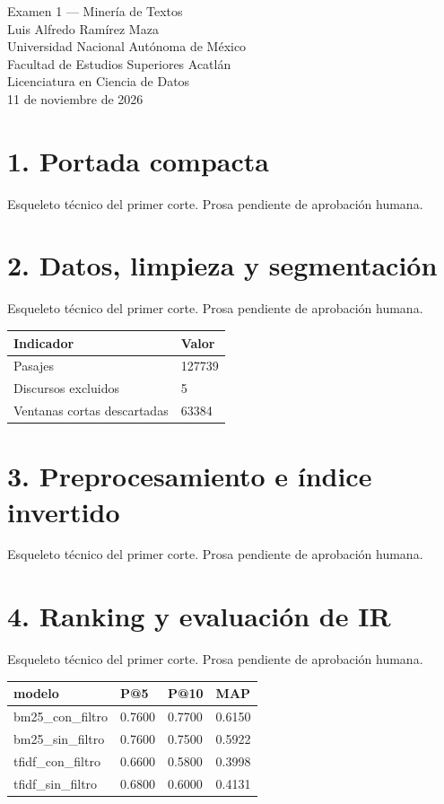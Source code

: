 \documentclass[11pt,a4paper]{article}
\begin{document}
\begin{center}\Large Examen 1 — Minería de Textos\\[8pt]
Luis Alfredo Ramírez Maza\\ Universidad Nacional Autónoma de México\\
Facultad de Estudios Superiores Acatlán\\
Licenciatura en Ciencia de Datos\\ 11 de noviembre de 2026\end{center}
\section*{1. Portada compacta}
Esqueleto técnico del primer corte. Prosa pendiente de aprobación humana.
\section*{2. Datos, limpieza y segmentación}
Esqueleto técnico del primer corte. Prosa pendiente de aprobación humana.
\par\medskip\noindent\begin{tabular}{ll}
\toprule
Indicador & Valor \\ \midrule
Pasajes & 127739 \\
Discursos excluidos & 5 \\
Ventanas cortas descartadas & 63384 \\
\bottomrule\end{tabular}\par\medskip

\newpage
\section*{3. Preprocesamiento e índice invertido}
Esqueleto técnico del primer corte. Prosa pendiente de aprobación humana.
\section*{4. Ranking y evaluación de IR}
Esqueleto técnico del primer corte. Prosa pendiente de aprobación humana.
\par\medskip\noindent\begin{tabular}{llll}
\toprule
modelo & P@5 & P@10 & MAP \\ \midrule
bm25\_con\_filtro & 0.7600 & 0.7700 & 0.6150 \\
bm25\_sin\_filtro & 0.7600 & 0.7500 & 0.5922 \\
tfidf\_con\_filtro & 0.6600 & 0.5800 & 0.3998 \\
tfidf\_sin\_filtro & 0.6800 & 0.6000 & 0.4131 \\
\bottomrule\end{tabular}\par\medskip
\end{document}
